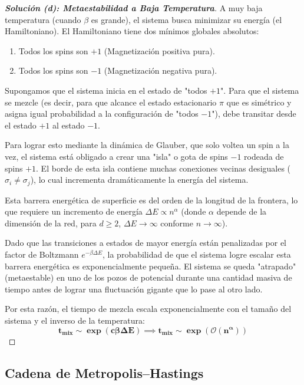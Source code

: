 \documentclass[10pt,a4paper]{article}
\begin{document}
\begin{proof}[\textbf{Solución (d): Metaestabilidad a Baja Temperatura}]
    A muy baja temperatura (cuando $\beta$ es grande), el sistema busca minimizar su energía (el Hamiltoniano). El Hamiltoniano tiene dos mínimos globales absolutos:
    \begin{enumerate}
        \item Todos los spins son $+1$ (Magnetización positiva pura).
        \item Todos los spins son $-1$ (Magnetización negativa pura).
    \end{enumerate}
    
    Supongamos que el sistema inicia en el estado de "todos $+1$". Para que el sistema se mezcle (es decir, para que alcance el estado estacionario $\pi$ que es simétrico y asigna igual probabilidad a la configuración de "todos $-1$"), debe transitar desde el estado $+1$ al estado $-1$.
    
    Para lograr esto mediante la dinámica de Glauber, que solo voltea un spin a la vez, el sistema está obligado a crear una "isla" o gota de spins $-1$ rodeada de spins $+1$. El borde de esta isla contiene muchas conexiones vecinas desiguales ($\sigma_i \neq \sigma_j$), lo cual incrementa dramáticamente la energía del sistema. 
    
    Esta barrera energética de superficie es del orden de la longitud de la frontera, lo que requiere un incremento de energía $\Delta E \propto n^{\alpha}$ (donde $\alpha$ depende de la dimensión de la red, para $d \ge 2$, $\Delta E \to \infty$ conforme $n \to \infty$).
    
    Dado que las transiciones a estados de mayor energía están penalizadas por el factor de Boltzmann $e^{-\beta \Delta E}$, la probabilidad de que el sistema logre escalar esta barrera energética es exponencialmente pequeña. El sistema se queda "atrapado" (metaestable) en uno de los pozos de potencial durante una cantidad masiva de tiempo antes de lograr una fluctuación gigante que lo pase al otro lado.
    
    Por esta razón, el tiempo de mezcla escala exponencialmente con el tamaño del sistema y el inverso de la temperatura:
    \[ \mathbf{t_{\text{mix}} \sim \exp(c \beta \Delta E) \implies t_{\text{mix}} \sim \exp(\mathcal{O}(n^{\alpha}))} \]
\end{proof}


\newpage

\subsection{Cadena de Metropolis–Hastings}
\end{document}
